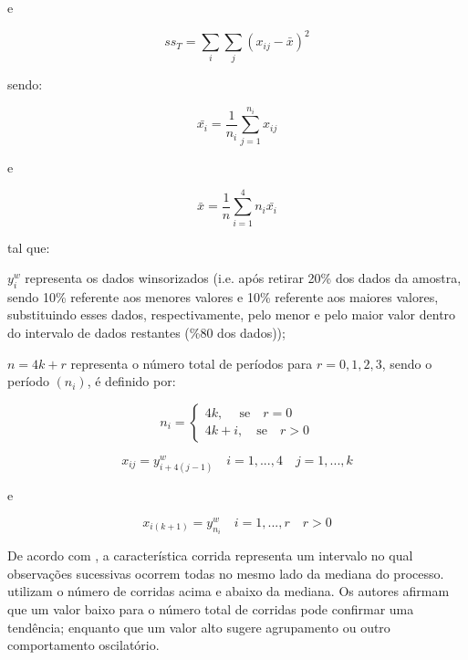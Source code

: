 \documentclass{book}
\begin{document}
e

\begin{equation}
ss_{T} = \sum_{i}\sum_{j}{(x_{ij}-\bar{x})^2}
\end{equation}

sendo:

\begin{equation}
\bar{x_i} = \frac{1}{n_i} \sum_{j=1}^{n_i}{x_{ij}}
\end{equation}

e

\begin{equation}
\bar{x} = \frac{1}{n} \sum_{i=1}^{4}{n_i \bar{x_i}}
\end{equation}

tal que: 

$y_{i}^w$ representa os dados winsorizados (i.e. após retirar 20\% dos dados da amostra, sendo 10\% referente aos menores valores e 10\% referente aos maiores valores, substituindo esses dados, respectivamente, pelo menor e pelo maior valor dentro do intervalo de dados restantes (\%80 dos dados)); 

$n=4k+r$ representa o número total de períodos para $r = 0, 1, 2, 3$, sendo o período $(n_i)$, é definido por:

\begin{equation}
n_i = 
\begin{cases}
4k, \ \quad \mathrm{se} \quad r =0 \\
4k + i, \quad \mathrm{se} \quad r > 0
\end{cases}
\end{equation}

\begin{equation}
x_{ij} = y_{i+4(j-1)}^w \quad i = 1,...,4 \quad j=1,...,k
\end{equation}

e

\begin{equation}
x_{i(k+1)} = y_{n_i}^w \quad i = 1,...,r \quad r>0
\end{equation}

De acordo com \cite{BusingerRead1999}, a característica corrida representa um intervalo no qual observações sucessivas ocorrem todas no mesmo lado da mediana do processo. \cite{BusingerRead1999} utilizam o número de corridas acima e abaixo da mediana. Os autores afirmam que um valor baixo para o número total de corridas pode confirmar uma tendência; enquanto que um valor alto sugere agrupamento ou outro comportamento oscilatório.
\end{document}
